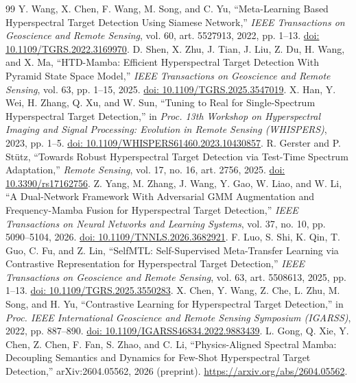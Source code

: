 \documentclass[a4paper,11pt]{article}
\begin{document}
\clearpage
\begingroup\footnotesize
\begin{thebibliography}{99}
\setlength{\itemsep}{1pt}
 Y. Wang, X. Chen, F. Wang, M. Song, and C. Yu, ``Meta-Learning Based Hyperspectral Target Detection Using Siamese Network,'' \emph{IEEE Transactions on Geoscience and Remote Sensing}, vol. 60, art. 5527913, 2022, pp. 1--13. \href{https://doi.org/10.1109/TGRS.2022.3169970}{doi: 10.1109/TGRS.2022.3169970}.
 D. Shen, X. Zhu, J. Tian, J. Liu, Z. Du, H. Wang, and X. Ma, ``HTD-Mamba: Efficient Hyperspectral Target Detection With Pyramid State Space Model,'' \emph{IEEE Transactions on Geoscience and Remote Sensing}, vol. 63, pp. 1--15, 2025. \href{https://doi.org/10.1109/TGRS.2025.3547019}{doi: 10.1109/TGRS.2025.3547019}.
 X. Han, Y. Wei, H. Zhang, Q. Xu, and W. Sun, ``Tuning to Real for Single-Spectrum Hyperspectral Target Detection,'' in \emph{Proc. 13th Workshop on Hyperspectral Imaging and Signal Processing: Evolution in Remote Sensing (WHISPERS)}, 2023, pp. 1--5. \href{https://doi.org/10.1109/WHISPERS61460.2023.10430857}{doi: 10.1109/WHISPERS61460.2023.10430857}.
 R. Gerster and P. St\"utz, ``Towards Robust Hyperspectral Target Detection via Test-Time Spectrum Adaptation,'' \emph{Remote Sensing}, vol. 17, no. 16, art. 2756, 2025. \href{https://doi.org/10.3390/rs17162756}{doi: 10.3390/rs17162756}.
 Z. Yang, M. Zhang, J. Wang, Y. Gao, W. Liao, and W. Li, ``A Dual-Network Framework With Adversarial GMM Augmentation and Frequency-Mamba Fusion for Hyperspectral Target Detection,'' \emph{IEEE Transactions on Neural Networks and Learning Systems}, vol. 37, no. 10, pp. 5090--5104, 2026. \href{https://doi.org/10.1109/TNNLS.2026.3682921}{doi: 10.1109/TNNLS.2026.3682921}.
 F. Luo, S. Shi, K. Qin, T. Guo, C. Fu, and Z. Lin, ``SelfMTL: Self-Supervised Meta-Transfer Learning via Contrastive Representation for Hyperspectral Target Detection,'' \emph{IEEE Transactions on Geoscience and Remote Sensing}, vol. 63, art. 5508613, 2025, pp. 1--13. \href{https://doi.org/10.1109/TGRS.2025.3550283}{doi: 10.1109/TGRS.2025.3550283}.
 X. Chen, Y. Wang, Z. Che, L. Zhu, M. Song, and H. Yu, ``Contrastive Learning for Hyperspectral Target Detection,'' in \emph{Proc. IEEE International Geoscience and Remote Sensing Symposium (IGARSS)}, 2022, pp. 887--890. \href{https://doi.org/10.1109/IGARSS46834.2022.9883439}{doi: 10.1109/IGARSS46834.2022.9883439}.
 L. Gong, Q. Xie, Y. Chen, Z. Chen, F. Fan, S. Zhao, and C. Li, ``Physics-Aligned Spectral Mamba: Decoupling Semantics and Dynamics for Few-Shot Hyperspectral Target Detection,'' arXiv:2604.05562, 2026 (preprint). \url{https://arxiv.org/abs/2604.05562}.

\end{thebibliography}
\end{document}
